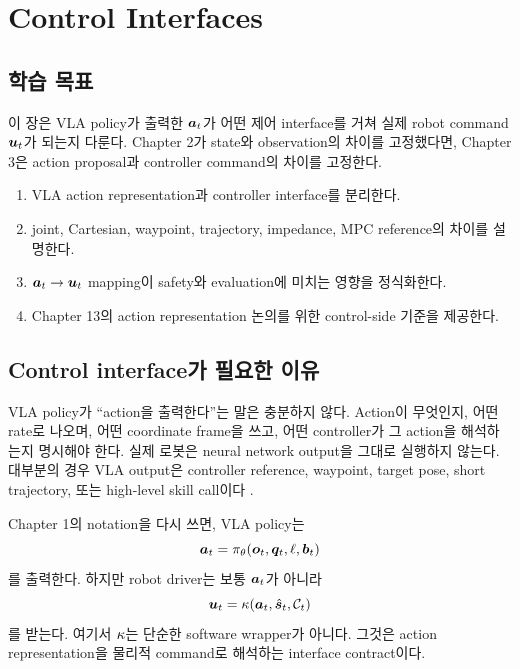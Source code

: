 \chapter{Control Interfaces}

\section*{학습 목표}
이 장은 VLA policy가 출력한 $\bm{a}_t$가 어떤 제어 interface를 거쳐 실제 robot command $\bm{u}_t$가 되는지 다룬다. Chapter 2가 state와 observation의 차이를 고정했다면, Chapter 3은 action proposal과 controller command의 차이를 고정한다.

\begin{enumerate}
  \item VLA action representation과 controller interface를 분리한다.
  \item joint, Cartesian, waypoint, trajectory, impedance, MPC reference의 차이를 설명한다.
  \item $\bm{a}_t \rightarrow \bm{u}_t$ mapping이 safety와 evaluation에 미치는 영향을 정식화한다.
  \item Chapter 13의 action representation 논의를 위한 control-side 기준을 제공한다.
\end{enumerate}

\section{Control interface가 필요한 이유}

VLA policy가 ``action을 출력한다''는 말은 충분하지 않다. Action이 무엇인지, 어떤 rate로 나오며, 어떤 coordinate frame을 쓰고, 어떤 controller가 그 action을 해석하는지 명시해야 한다. 실제 로봇은 neural network output을 그대로 실행하지 않는다. 대부분의 경우 VLA output은 controller reference, waypoint, target pose, short trajectory, 또는 high-level skill call이다 \cite{khatib1987,hogan1985,mayne2000}.

Chapter 1의 notation을 다시 쓰면, VLA policy는
\begin{equation}
  \bm{a}_t = \pi_\theta(\bm{o}_t, \bm{q}_t, \ell, \bm{b}_t)
  \label{eq:ch3-policy}
\end{equation}
를 출력한다. 하지만 robot driver는 보통 $\bm{a}_t$가 아니라
\begin{equation}
  \bm{u}_t = \kappa(\bm{a}_t,\hat{\bm{s}}_t,\mathcal{C}_t)
  \label{eq:ch3-controller-map}
\end{equation}
를 받는다. 여기서 $\kappa$는 단순한 software wrapper가 아니다. 그것은 action representation을 물리적 command로 해석하는 interface contract이다.

